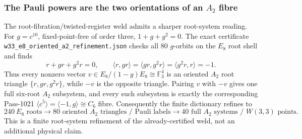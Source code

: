 \subsubsection{The Pauli powers are the two orientations of an $A_2$ fibre}
The root-fibration/twisted-register weld admits a sharper root-system reading.
For $g=c^{10}$, fixed-point-free of order three, $1+g+g^2=0$.  The exact
certificate \texttt{w33\_e8\_oriented\_a2\_refinement.json} checks all 80
$g$-orbits on the $E_8$ root shell and finds
\[
 r+gr+g^2r=0,
 \qquad
 \langle r,gr\rangle=\langle gr,g^2r\rangle=
 \langle g^2r,r\rangle=-1.
\]
Thus every nonzero vector $v\in E_8/(1-g)E_8\cong\mathbb F_3^4$ is an
oriented $A_2$ root triangle $\{r,gr,g^2r\}$, while $-v$ is the opposite
triangle.  Pairing $v$ with $-v$ gives one full six-root $A_2$ subsystem,
and every such subsystem is exactly the corresponding Pass-1021
$\langle c^5\rangle=\langle-1,g\rangle\cong C_6$ fibre.  Consequently the
finite dictionary refines to
\[
240\ E_8\text{ roots}\longrightarrow
80\text{ oriented }A_2\text{ triangles / Pauli labels}\longrightarrow
40\text{ full }A_2\text{ systems / }W(3,3)\text{ points}.
\]
This is a finite root-system refinement of the already-certified weld, not an
additional physical claim.
